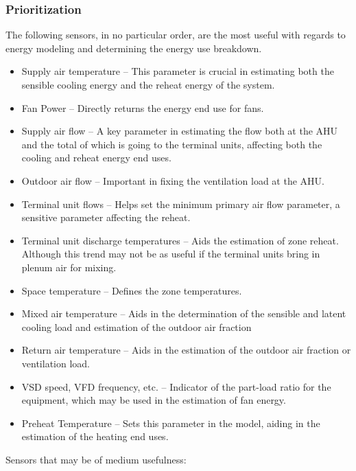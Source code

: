 \subsubsection{Prioritization} \label{sec:Prioritization}
The following sensors, in no particular order, are the most useful with
regards to energy modeling and determining the energy use breakdown. 
\begin{itemize}
\item Supply air temperature -- This parameter is crucial in estimating both the sensible cooling energy and the reheat energy of the system. 
\item Fan Power -- Directly returns the energy end use for fans.
\item Supply air flow -- A key parameter in estimating the flow both at the AHU and the total of which is going to the terminal units, affecting both the cooling and reheat energy end uses.
\item Outdoor air flow -- Important in fixing the ventilation load at the AHU.
\item Terminal unit flows -- Helps set the minimum primary air flow parameter, a sensitive parameter affecting the reheat. 
\item Terminal unit discharge temperatures -- Aids the estimation of
    zone reheat. Although this trend may not be as useful if the
    terminal units bring in plenum air for mixing. 
\item Space temperature -- Defines the zone temperatures. 
\item Mixed air temperature -- Aids in the determination of the sensible
    and latent cooling load and estimation of the outdoor air fraction
\item Return air temperature -- Aids in the estimation of the outdoor air fraction or ventilation load.
\item VSD speed, VFD frequency, etc. -- Indicator of the part-load ratio for the equipment, which may be used in the estimation of fan energy. 
\item Preheat Temperature -- Sets this parameter in the model, aiding in the estimation of the heating end uses.
\end{itemize}

Sensors that may be of medium usefulness:

